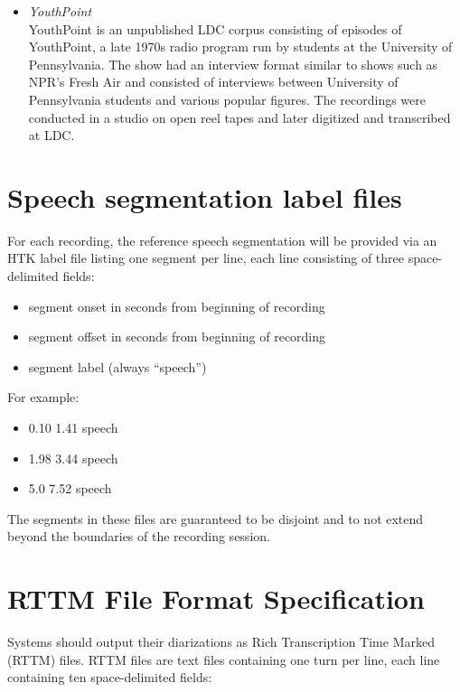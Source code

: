 \documentclass{article}
\begin{document}
\begin{appendices}
\begin{itemize}
        \item {\it YouthPoint} \\
            YouthPoint is an unpublished LDC corpus consisting of episodes of YouthPoint, a late 1970s radio program run by students at the University of Pennsylvania. The show had an interview format similar to shows such as NPR's Fresh Air and consisted of interviews between University of Pennsylvania students and various popular figures. The recordings were conducted in a studio on open reel tapes and later digitized and transcribed at LDC.
    \end{itemize}



\newpage
\section{Speech segmentation label files}
\label{app:sad}
For each recording, the reference speech segmentation will be provided via an HTK label file listing one segment per line, each line consisting of three space-delimited fields:
    \begin{itemize}
        \item segment onset in seconds from beginning of recording
        \item segment offset in seconds from beginning of recording
        \item segment label (always ``speech'')
    \end{itemize}
For example:
    \begin{itemize}
        \item[] 0.10 1.41 speech
        \item[] 1.98 3.44 speech
        \item[] 5.0 7.52 speech
    \end{itemize}
The segments in these files are guaranteed to be disjoint and to not extend beyond the boundaries of the recording session.




\newpage
\section{RTTM File Format Specification}
\label{app:rttm}
Systems should output their diarizations as Rich Transcription Time Marked (RTTM) files. RTTM files are text files containing one turn per line, each line containing ten space-delimited fields:


\end{appendices}
\end{document}
